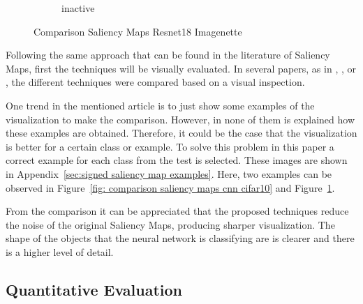 \documentclass[preprint,12pt]{elsarticle}
\begin{document}
\begin{figure}
\begin{subfigure}{0.14\textwidth}
        \caption{inactive}
    \end{subfigure}
    \caption{Comparison Saliency Maps Resnet18 Imagenette}
    \label{fig: comparison saliency maps resnet18 imagenette}
\end{figure}

Following the same approach that can be found in the literature of Saliency Maps, first the techniques will be visually evaluated. In several papers, as in \cite{simonyanDeepConvolutionalNetworks2014a}, \cite{springenbergStrivingSimplicityAll2015}, \cite{smilkovSmoothGradRemovingNoise} or \cite{sundararajanAxiomaticAttributionDeep2017}, the different techniques were compared based on a visual inspection. 

One trend in the mentioned article is to just show some examples of the visualization to make the comparison. However, in none of them is explained how these examples are obtained. Therefore, it could be the case that the visualization is better for a certain class or example. To solve this problem in this paper a correct example for each class from the test is selected. These images are shown in Appendix~\ref{sec:signed saliency map examples}. Here, two examples can be observed in Figure~\ref{fig: comparison saliency maps cnn cifar10} and Figure~\ref{fig: comparison saliency maps resnet18 imagenette}.

From the comparison it can be appreciated that the proposed techniques reduce the noise of the original Saliency Maps, producing sharper visualization. The shape of the objects that the neural network is classifying are is clearer and there is a higher level of detail.

\subsection{Quantitative Evaluation}
\end{document}
